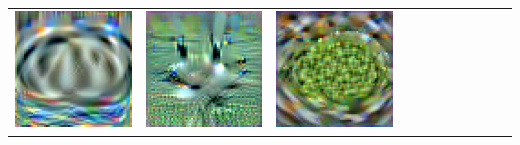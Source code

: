 {\begin{center}
\begin{tabular}{ccccccccccc}
    \includegraphics[align=c,width=\coverwidth\linewidth]{figures/cover/tiny/0_guinea_pig_0.pdf} &
    \includegraphics[align=c,width=\coverwidth\linewidth]{figures/cover/tiny/goose_0.pdf} &
    \includegraphics[align=c,width=\coverwidth\linewidth]{figures/cover/tiny/guacamole_0.pdf} &

\end{tabular}
\end{center}}
